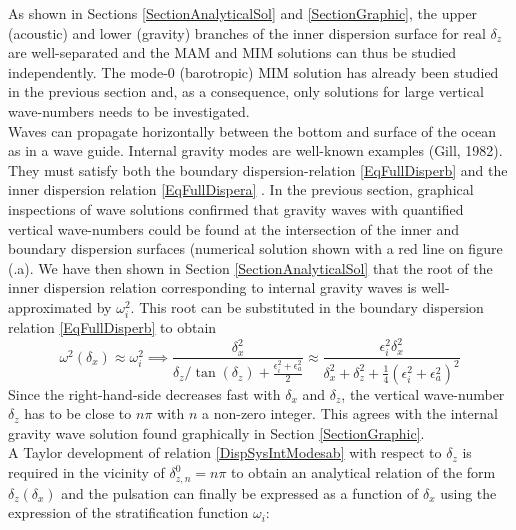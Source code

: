 \documentclass[a4paper,11pt]{article}
\begin{document}
As shown in Sections \ref{SectionAnalyticalSol} and \ref{SectionGraphic}, the upper (acoustic) and lower (gravity) branches of the inner dispersion surface for real $\delta_z$ are well-separated and the MAM and MIM solutions can thus be studied independently. The mode-0 (barotropic) MIM solution has already been studied in the previous section and, as a consequence, only solutions for large vertical wave-numbers needs to be investigated.\\
Waves can propagate horizontally between the bottom and surface of the ocean as in a wave guide. Internal gravity modes are well-known examples (Gill, 1982). They must satisfy both the boundary dispersion-relation \ref{EqFullDisperb} and the inner dispersion relation \ref{EqFullDispera} . In the previous section, graphical inspections of wave solutions confirmed that gravity waves with quantified vertical wave-numbers could be found at the intersection of the inner and boundary dispersion surfaces (numerical solution shown with a red line on figure (.a).
We have then shown in Section \ref{SectionAnalyticalSol} that the root of the inner dispersion relation corresponding to internal gravity waves is well-approximated by $\omega_i^2$. This root can be substituted in the boundary dispersion relation \ref{EqFullDisperb} to obtain
\begin{equation}
	   \label{DispSysIntModesab}
		\omega^2(\delta_x) \approx\omega_i^2\implies
		\frac{\delta_x^2}
		{\delta_z/\tan(\delta_z)+\frac{\epsilon_i^2+\epsilon_a^2}{2}}
		\approx
		\frac{\epsilon_i^2 \delta_x^2}{\delta_x^2
		+\delta_z^2+\frac{1}{4}\left(
		\epsilon_i^2+\epsilon_a^2\right)^2}
\end{equation}
Since the right-hand-side decreases fast with $\delta_x$ and $\delta_z$, the vertical wave-number $\delta_z$ has to be close to $n\pi$ with $n$ a non-zero integer. This agrees with the internal gravity wave solution found graphically in Section \ref{SectionGraphic}.\\
A Taylor development of relation \ref{DispSysIntModesab} with respect to $\delta_z$ is required in the vicinity of $\delta_{z,n}^0=n\pi$ to obtain an analytical relation of the form $\delta_z(\delta_x)$ and the pulsation can finally be expressed as a function of $\delta_x$ using the expression of the stratification function $\omega_i$:
\end{document}
